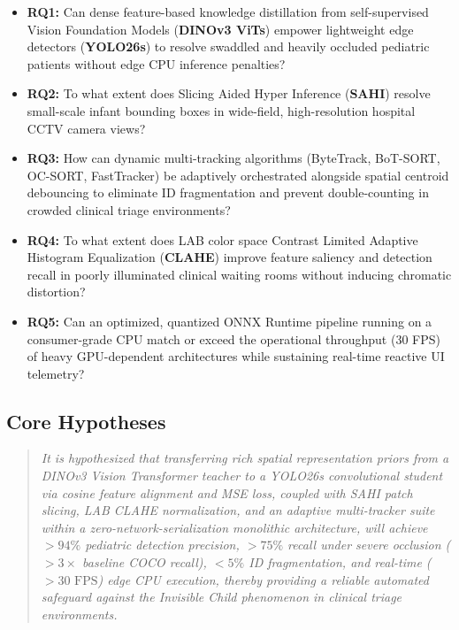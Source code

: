 \begin{itemize}
    \item \textbf{RQ1:} Can dense feature-based knowledge distillation from self-supervised Vision Foundation Models (\textbf{DINOv3 ViTs}) empower lightweight edge detectors (\textbf{YOLO26s}) to resolve swaddled and heavily occluded pediatric patients without edge CPU inference penalties?
    \item \textbf{RQ2:} To what extent does Slicing Aided Hyper Inference (\textbf{SAHI}) resolve small-scale infant bounding boxes in wide-field, high-resolution hospital CCTV camera views?
    \item \textbf{RQ3:} How can dynamic multi-tracking algorithms (ByteTrack, BoT-SORT, OC-SORT, FastTracker) be adaptively orchestrated alongside spatial centroid debouncing to eliminate ID fragmentation and prevent double-counting in crowded clinical triage environments?
    \item \textbf{RQ4:} To what extent does LAB color space Contrast Limited Adaptive Histogram Equalization (\textbf{CLAHE}) improve feature saliency and detection recall in poorly illuminated clinical waiting rooms without inducing chromatic distortion?
    \item \textbf{RQ5:} Can an optimized, quantized ONNX Runtime pipeline running on a consumer-grade CPU match or exceed the operational throughput (30 FPS) of heavy GPU-dependent architectures while sustaining real-time reactive UI telemetry?
\end{itemize}

\subsection{Core Hypotheses}
\begin{quote}
\textit{It is hypothesized that transferring rich spatial representation priors from a DINOv3 Vision Transformer teacher to a YOLO26s convolutional student via cosine feature alignment and MSE loss, coupled with SAHI patch slicing, LAB CLAHE normalization, and an adaptive multi-tracker suite within a zero-network-serialization monolithic architecture, will achieve $>94\%$ pediatric detection precision, $>75\%$ recall under severe occlusion ($>3\times$ baseline COCO recall), $<5\%$ ID fragmentation, and real-time ($>30\text{ FPS}$) edge CPU execution, thereby providing a reliable automated safeguard against the Invisible Child phenomenon in clinical triage environments.}
\end{quote}

